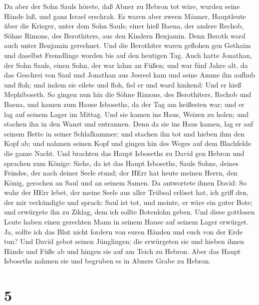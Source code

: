  Da aber der Sohn Sauls hörete, daß Abner zu Hebron tot
wäre, wurden seine Hände laß, und ganz Israel erschrak.  Es
waren aber zween Männer, Hauptleute über die Krieger, unter dem Sohn
Sauls; einer hieß Baena, der andere Rechob, Söhne Rimons, des
Berothiters, aus den Kindern Benjamin. Denn Beroth ward auch unter
Benjamin gerechnet.  Und die Berothiter waren geflohen gen
Gethaim und daselbst Fremdlinge worden bis auf den heutigen Tag.
 Auch hatte Jonathan, der Sohn Sauls, einen Sohn, der war
lahm an Füßen; und war fünf Jahre alt, da das Geschrei von Saul und
Jonathan aus Jesreel kam und seine Amme ihn aufhub und floh; und indem
sie eilete und floh, fiel er und ward hinkend: Und er hieß Mephiboseth.
 So gingen nun hin die Söhne Rimons, des Berothiters, Rechob
und Baena, und kamen zum Hause Isboseths, da der Tag am heißesten war;
und er lag auf seinem Lager im Mittag.  Und sie kamen ins
Haus, Weizen zu holen; und stachen ihn in den Wanst und entrannen.
 Denn da sie ins Haus kamen, lag er auf seinem Bette in
seiner Schlafkammer; und stachen ihn tot und hieben ihm den Kopf ab; und
nahmen seinen Kopf und gingen hin des Weges auf dem Blachfelde die ganze
Nacht.  Und brachten das Haupt Isboseths zu David gen Hebron
und sprachen zum Könige: Siehe, da ist das Haupt Isboseths, Sauls Sohns,
deines Feindes, der nach deiner Seele stund; der HErr hat heute meinen
Herrn, den König, gerochen an Saul und an seinem Samen.  Da
antwortete ihnen David: So wahr der HErr lebet, der meine Seele aus
aller Trübsal erlöset hat,  ich griff den, der mir
verkündigte und sprach: Saul ist tot, und meinte, er wäre ein guter
Bote; und erwürgete ihn zu Ziklag, dem ich sollte Botenlohn geben.
 Und diese gottlosen Leute haben einen gerechten Mann in
seinem Hause auf seinem Lager erwürget. Ja, sollte ich das Blut nicht
fordern von euren Händen und euch von der Erde tun?  Und
David gebot seinen Jünglingen; die erwürgeten sie und hieben ihnen Hände
und Füße ab und hingen sie auf am Teich zu Hebron. Aber das Haupt
Isboseths nahmen sie und begruben es in Abners Grabe zu Hebron.

\hypertarget{section-4}{%
\section{5}\label{section-4}}

